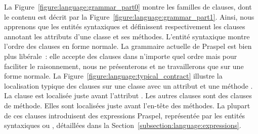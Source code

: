La Figure~\ref{figure:language:grammar_part0} montre les familles de clauses,
dont le contenu est décrit par la Figure~\ref{figure:language:grammar_part1}.
Ainsi, nous apprenons que les entités syntaxiques  et
 définissent respectivement les clauses annotant les
attributs d'une classe et ses méthodes.  L'entité syntaxique
 montre l'ordre des clauses en forme normale. La grammaire
actuelle de Praspel est bien plus libérale~: elle accepte des clauses dans
n'importe quel ordre mais pour faciliter le raisonnement, nous ne présenterons
et ne travaillerons que sur une forme normale. La
Figure~\ref{figure:language:typical_contract} illustre la localisation typique
des clauses sur une classe  avec un attribut  et une méthode
. La clause \ainvariant est localisée juste avant l'attribut .
Les autres clauses sont des clauses de méthode.  Elles sont localisées juste
avant l'en-tête des méthodes. La plupart de ces clauses introduisent des
expressions Praspel, représentée par les entités syntaxiques 
ou , détaillées dans la
Section~\ref{subsection:language:expressions}.

